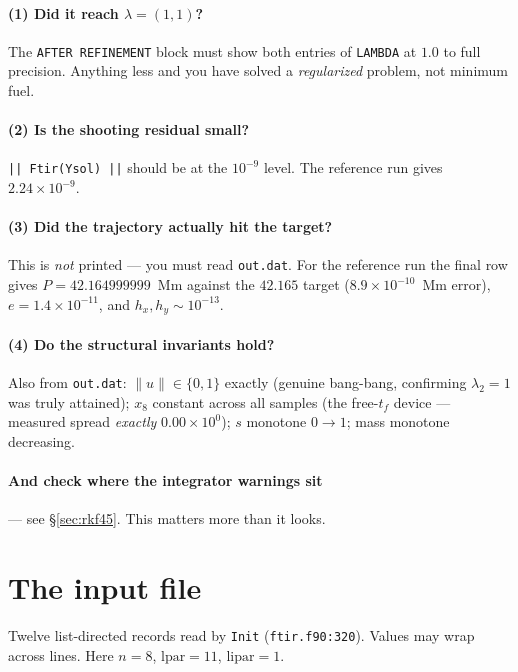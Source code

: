 \documentclass[11pt]{article}
\newcommand{\code}[1]{\texttt{\small #1}}
\newcommand{\file}[1]{\texttt{\small #1}}
\begin{document}
\paragraph{(1) Did it reach $\lambda = (1,1)$?}
The \code{AFTER REFINEMENT} block must show both entries of \code{LAMBDA} at
$1.0$ to full precision. Anything less and you have solved a
\emph{regularized} problem, not minimum fuel.

\paragraph{(2) Is the shooting residual small?}
\code{|| Ftir(Ysol) ||} should be at the $10^{-9}$ level. The reference run
gives $2.24\times10^{-9}$.

\paragraph{(3) Did the trajectory actually hit the target?}
This is \emph{not} printed --- you must read \file{out.dat}. For the reference
run the final row gives $P = 42.164999999$~Mm against the $42.165$ target
($8.9\times10^{-10}$~Mm error), $e = 1.4\times10^{-11}$, and
$h_x, h_y \sim 10^{-13}$.

\paragraph{(4) Do the structural invariants hold?}
Also from \file{out.dat}: $\|u\| \in \{0,1\}$ exactly (genuine bang-bang,
confirming $\lambda_2 = 1$ was truly attained); $x_8$ constant across all
samples (the free-$t_f$ device --- measured spread \emph{exactly}
$0.00\times10^{0}$); $s$ monotone $0 \to 1$; mass monotone decreasing.

\paragraph{And check where the integrator warnings sit} ---
see \S\ref{sec:rkf45}. This matters more than it looks.

\section{The input file}\label{sec:input}

Twelve list-directed records read by \code{Init} (\file{ftir.f90:320}). Values
may wrap across lines. Here $n = 8$, $\mathrm{lpar} = 11$,
$\mathrm{lipar} = 1$.
\end{document}

